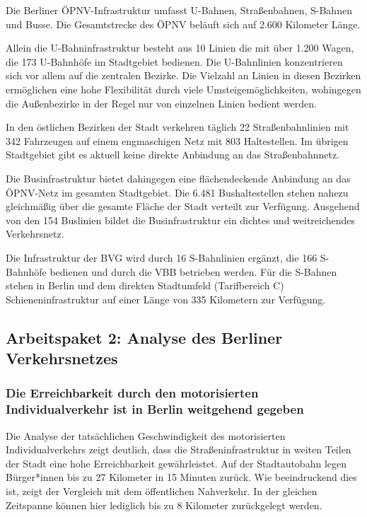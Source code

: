 Die Berliner ÖPNV-Infrastruktur umfasst U-Bahnen, Straßenbahnen, S-Bahnen und Busse. Die Gesamtstrecke des ÖPNV beläuft sich auf 2.600 Kilometer Länge.

Allein die U-Bahninfrastruktur besteht aus 10 Linien die mit über 1.200 Wagen, die 173 U-Bahnhöfe im Stadtgebiet bedienen. Die U-Bahnlinien konzentrieren sich vor allem auf die zentralen Bezirke. Die Vielzahl an Linien in diesen Bezirken ermöglichen eine hohe Flexibilität durch viele Umsteigemöglichkeiten, wohingegen die Außenbezirke in der Regel nur von einzelnen Linien bedient werden.

In den östlichen Bezirken der Stadt verkehren täglich 22 Straßenbahnlinien mit 342 Fahrzeugen auf einem engmaschigen Netz mit 803 Haltestellen. Im übrigen Stadtgebiet gibt es aktuell keine direkte Anbindung an das Straßenbahnnetz.

Die Businfrastruktur bietet dahingegen eine flächendeckende Anbindung an das ÖPNV-Netz im gesamten Stadtgebiet. Die 6.481 Bushaltestellen stehen nahezu gleichmäßig über die gesamte Fläche der Stadt verteilt zur Verfügung. Ausgehend von den 154 Buslinien bildet die Businfrastruktur ein dichtes und weitreichendes Verkehrsnetz.

Die Infrastruktur der BVG wird durch 16 S-Bahnlinien ergänzt, die 166 S-Bahnhöfe bedienen und durch die VBB betrieben werden. Für die S-Bahnen stehen in Berlin und dem direkten Stadtumfeld (Tarifbereich C) Schieneninfrastruktur auf einer Länge von 335 Kilometern zur Verfügung.



\subsection{Arbeitspaket 2: Analyse des Berliner Verkehrsnetzes}

\subsubsection{Die Erreichbarkeit durch den motorisierten Individualverkehr ist in Berlin weitgehend gegeben}

Die Analyse der tatsächlichen Geschwindigkeit des motorisierten Individualverkehrs zeigt deutlich, dass die Straßeninfrastruktur in weiten Teilen der Stadt eine hohe Erreichbarkeit gewährleistet. Auf der Stadtautobahn legen Bürger*innen bis zu 27 Kilometer in 15 Minuten zurück. Wie beeindruckend dies ist, zeigt der Vergleich mit dem öffentlichen Nahverkehr. In der gleichen Zeitspanne können hier lediglich bis zu 8 Kilometer zurückgelegt werden.

